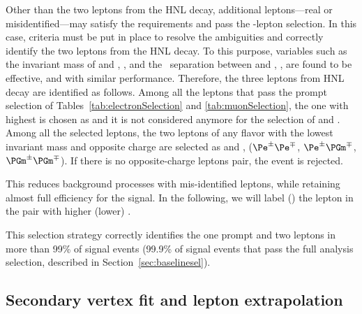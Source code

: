 Other than the two leptons from the HNL decay, additional
leptons---real or misidentified---may satisfy the \absdxy requirements
and pass the \displ-lepton selection. In this case, criteria must
be put in place to resolve the ambiguities and correctly identify the
two leptons from the HNL decay.
To this purpose, variables such as the invariant mass of \ltwo and
\lthree, \mtwol, and the \DR\ separation between \ltwo and \lthree, \DRtwol, are found to be
effective, and with similar performance.
Therefore, the three leptons from HNL decay are identified as follows.
Among all the leptons that pass the prompt selection of
Tables~\ref{tab:electronSelection} and \ref{tab:muonSelection}, the one
with highest \pt is chosen as \lone and it is not considered anymore for the selection of \ltwo and \lthree.
Among all the selected \displ leptons, the two leptons of any
flavor with the lowest invariant mass and opposite charge are selected
as \ltwo and \lthree,
($\Pe^\pm\Pe^\mp$, $\Pe^\pm\PGm^\mp$, $\PGm^\pm\PGm^\mp$).
If there is no opposite-charge \displ leptons pair, the
event is rejected. 

This reduces background processes with
mis-identified leptons, while retaining almost full efficiency for the
signal. In the following, we will label \ltwo (\lthree) the lepton in
the pair with higher (lower) \pt.

This selection strategy correctly identifies the one prompt and two
\displ leptons in more than 99\% of signal events (99.9\% of
signal events that pass the full analysis selection, described in
Section~\ref{sec:baselinesel}).

\subsection{Secondary vertex fit and lepton extrapolation}

